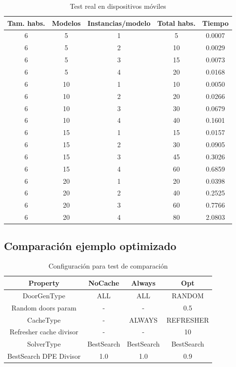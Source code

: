 \begin{table}[H]
\begin{center}
	\begin{tabular}{ | c | c | c | c | c | }
\hline
Tam. habs. & Modelos & Instancias/modelo & Total habs. & Tiempo \\ \hline 
6 & 5 & 1 & 5 & 0.0007 \\ 
6 & 5 & 2 & 10 & 0.0029 \\ 
6 & 5 & 3 & 15 & 0.0073 \\ 
6 & 5 & 4 & 20 & 0.0168 \\ 
6 & 10 & 1 & 10 & 0.0050 \\ 
6 & 10 & 2 & 20 & 0.0266 \\ 
6 & 10 & 3 & 30 & 0.0679 \\ 
6 & 10 & 4 & 40 & 0.1601 \\ 
6 & 15 & 1 & 15 & 0.0157 \\ 
6 & 15 & 2 & 30 & 0.0905 \\ 
6 & 15 & 3 & 45 & 0.3026 \\ 
6 & 15 & 4 & 60 & 0.6859 \\ 
6 & 20 & 1 & 20 & 0.0398 \\ 
6 & 20 & 2 & 40 & 0.2525 \\ 
6 & 20 & 3 & 60 & 0.7766 \\ 
6 & 20 & 4 & 80 & 2.0803 \\ 
\hline
	\end{tabular}
\end{center}
\caption{Test real en dispositivos móviles}
\label{table:optreal}
\end{table}




\subsection{Comparación ejemplo optimizado}

\begin{table}[H]
\begin{center}
	\begin{tabular}{ | c | c | c | c | }
\hline
Property & NoCache & Always & Opt \\ \hline
DoorGenType & ALL & ALL & RANDOM \\
Random doors param & - & - & 0.5 \\
CacheType & - & ALWAYS & REFRESHER \\
Refresher cache divisor & - & - & 10 \\
SolverType & BestSearch & BestSearch & BestSearch \\
BestSearch DPE Divisor & 1.0 & 1.0 & 0.9 \\
\hline
	\end{tabular}
\end{center}
\caption{Configuración para test de comparación}
\label{table:cfg-comp}
\end{table}


